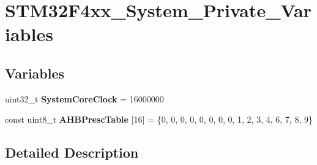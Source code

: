 \hypertarget{group___s_t_m32_f4xx___system___private___variables}{}\section{S\+T\+M32\+F4xx\+\_\+\+System\+\_\+\+Private\+\_\+\+Variables}
\label{group___s_t_m32_f4xx___system___private___variables}
\subsection*{Variables}
\begin{DoxyCompactItemize}
\item 
\hypertarget{group___s_t_m32_f4xx___system___private___variables_gaa3cd3e43291e81e795d642b79b6088e6}{}\label{group___s_t_m32_f4xx___system___private___variables_gaa3cd3e43291e81e795d642b79b6088e6} 
uint32\+\_\+t {\bfseries System\+Core\+Clock} = 16000000
\item 
\hypertarget{group___s_t_m32_f4xx___system___private___variables_ga6e1d9cd666f0eacbfde31e9932a93466}{}\label{group___s_t_m32_f4xx___system___private___variables_ga6e1d9cd666f0eacbfde31e9932a93466} 
const uint8\+\_\+t {\bfseries A\+H\+B\+Presc\+Table} \mbox{[}16\mbox{]} = \{0, 0, 0, 0, 0, 0, 0, 0, 1, 2, 3, 4, 6, 7, 8, 9\}
\end{DoxyCompactItemize}


\subsection{Detailed Description}
